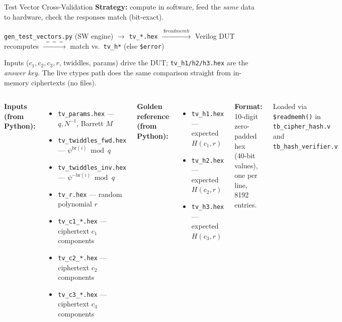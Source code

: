 \documentclass[aspectratio=169, 11pt]{beamer}
\begin{document}
\begin{frame}{Test Vector Cross-Validation}
\textbf{Strategy:} compute in software, feed the \emph{same} data to hardware, check the responses match (bit-exact).

\vspace{0.3em}
\begin{center}
\scriptsize
\texttt{gen\_test\_vectors.py} (SW engine) $\to$ \texttt{tv\_*.hex}
$\xrightarrow{\;\$readmemh\;}$ Verilog DUT recomputes
$\xrightarrow{\;===\;}$ match vs.\ \texttt{tv\_h*} (else \texttt{\$error})
\end{center}

\vspace{0.3em}
Inputs ($c_1,c_2,c_3,r$, twiddles, params) drive the DUT; \texttt{tv\_h1/h2/h3.hex} are the \emph{answer key}.
The live ctypes path does the same comparison straight from in-memory ciphertexts (no files).

\vspace{0.5em}
\begin{columns}[T]
\textbf{Inputs (from Python):}
\begin{itemize}
    \item \texttt{tv\_params.hex} --- $q, N^{-1}$, Barrett $M$
    \item \texttt{tv\_twiddles\_fwd.hex} --- $\psi^{\text{br}(i)} \bmod q$
    \item \texttt{tv\_twiddles\_inv.hex} --- $\psi^{-\text{br}(i)} \bmod q$
    \item \texttt{tv\_r.hex} --- random polynomial $r$
    \item \texttt{tv\_c1\_*.hex} --- ciphertext $c_1$ components
    \item \texttt{tv\_c2\_*.hex} --- ciphertext $c_2$ components
    \item \texttt{tv\_c3\_*.hex} --- ciphertext $c_3$ components
\end{itemize}

\textbf{Golden reference (from Python):}
\begin{itemize}
    \item \texttt{tv\_h1.hex} --- expected $H(c_1, r)$
    \item \texttt{tv\_h2.hex} --- expected $H(c_2, r)$
    \item \texttt{tv\_h3.hex} --- expected $H(c_3, r)$
\end{itemize}

\vspace{0.5em}
\textbf{Format:} 10-digit zero-padded hex\\
(40-bit values), one per line, 8192 entries.

\vspace{0.5em}
Loaded via \texttt{\$readmemh()} in\\
\texttt{tb\_cipher\_hash.v} and\\
\texttt{tb\_hash\_verifier.v}
\end{columns}
\end{frame}
\end{document}
